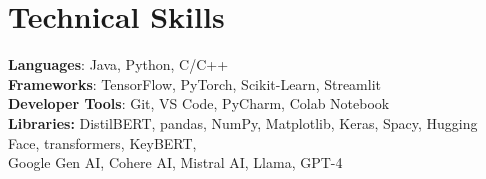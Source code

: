\documentclass[letterpaper,11pt]{article}
\begin{document}
\section{Technical Skills}
 \begin{itemize}[leftmargin=0.15in, label={}]
    \small{\item{
     \textbf{Languages}{: Java, Python, C/C++} \\
     \textbf{Frameworks}{: TensorFlow, PyTorch, Scikit-Learn, Streamlit} \\
     \textbf{Developer Tools}{: Git, VS Code, PyCharm, Colab Notebook} \\
     \textbf{Libraries:} DistilBERT, pandas, NumPy, Matplotlib, Keras, Spacy, Hugging Face, transformers, KeyBERT, \\
Google Gen AI, Cohere AI, Mistral AI, Llama, GPT-4

    }}
 \end{itemize}

\end{document}
